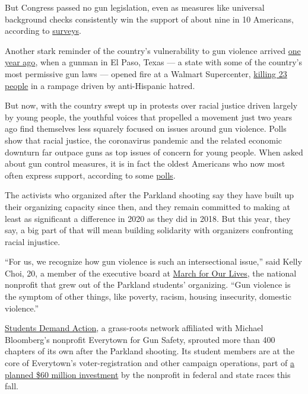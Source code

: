 But Congress passed no gun legislation, even as measures like universal
background checks consistently win the support of about nine in 10
Americans, according to
\href{http://maristpoll.marist.edu/npr-pbs-newshour-marist-poll-results-and-analysis-4/\#sthash.d89KlpFU.5oyynxDB.dpbs}{surveys}.

Another stark reminder of the country's vulnerability to gun violence
arrived
\href{https://www.nytimes3xbfgragh.onion/2019/08/03/us/el-paso-shooting.html}{one
year ago}, when a gunman in El Paso, Texas --- a state with some of the
country's most permissive gun laws --- opened fire at a Walmart
Supercenter,
\href{https://www.nytimes3xbfgragh.onion/2019/08/03/us/el-paso-shooting.html}{killing
23 people} in a rampage driven by anti-Hispanic hatred.

But now, with the country swept up in protests over racial justice
driven largely by young people, the youthful voices that propelled a
movement just two years ago find themselves less squarely focused on
issues around gun violence. Polls show that racial justice, the
coronavirus pandemic and the related economic downturn far outpace guns
as top issues of concern for young people. When asked about gun control
measures, it is in fact the oldest Americans who now most often express
support, according to some
\href{https://poll.qu.edu/national/release-detail?ReleaseID=3639}{polls}.

The activists who organized after the Parkland shooting say they have
built up their organizing capacity since then, and they remain committed
to making at least as significant a difference in 2020 as they did in
2018. But this year, they say, a big part of that will mean building
solidarity with organizers confronting racial injustice.

``For us, we recognize how gun violence is such an intersectional
issue,'' said Kelly Choi, 20, a member of the executive board at
\href{https://marchforourlives.com/}{March for Our Lives}, the national
nonprofit that grew out of the Parkland students' organizing. ``Gun
violence is the symptom of other things, like poverty, racism, housing
insecurity, domestic violence.''

\href{https://studentsdemandaction.org/}{Students Demand Action}, a
grass-roots network affiliated with Michael Bloomberg's nonprofit
Everytown for Gun Safety, sprouted more than 400 chapters of its own
after the Parkland shooting. Its student members are at the core of
Everytown's voter-registration and other campaign operations, part of
\href{https://www.nytimes3xbfgragh.onion/2020/07/23/us/politics/bloomberg-guns.html}{a
planned \$60 million investment} by the nonprofit in federal and state
races this fall.

